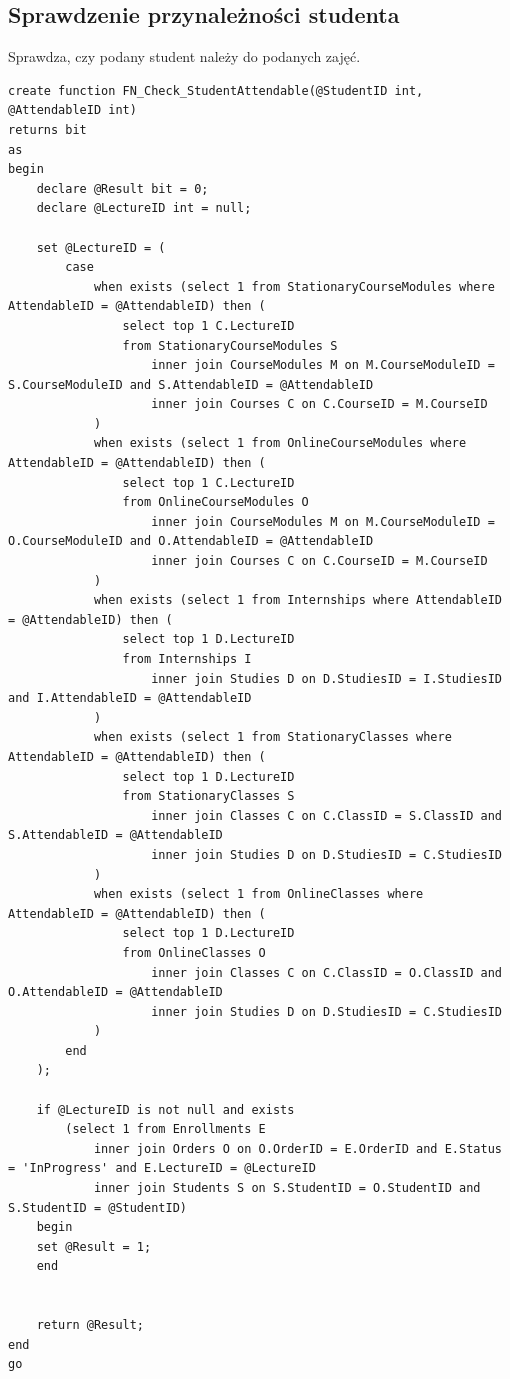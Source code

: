 \documentclass[11pt,a4paper]{article}
\begin{document}
\subsection{Sprawdzenie przynależności studenta}
Sprawdza, czy podany student należy do podanych zajęć.
\begin{Verbatim}[breaklines=true]
create function FN_Check_StudentAttendable(@StudentID int, @AttendableID int)
returns bit
as
begin
    declare @Result bit = 0;
    declare @LectureID int = null;

    set @LectureID = (
        case 
            when exists (select 1 from StationaryCourseModules where AttendableID = @AttendableID) then (
                select top 1 C.LectureID
                from StationaryCourseModules S
                    inner join CourseModules M on M.CourseModuleID = S.CourseModuleID and S.AttendableID = @AttendableID
                    inner join Courses C on C.CourseID = M.CourseID
            )
            when exists (select 1 from OnlineCourseModules where AttendableID = @AttendableID) then (
                select top 1 C.LectureID 
                from OnlineCourseModules O
                    inner join CourseModules M on M.CourseModuleID = O.CourseModuleID and O.AttendableID = @AttendableID
                    inner join Courses C on C.CourseID = M.CourseID
            )
            when exists (select 1 from Internships where AttendableID = @AttendableID) then (
                select top 1 D.LectureID 
                from Internships I
                    inner join Studies D on D.StudiesID = I.StudiesID and I.AttendableID = @AttendableID
            )
            when exists (select 1 from StationaryClasses where AttendableID = @AttendableID) then (
                select top 1 D.LectureID 
                from StationaryClasses S
                    inner join Classes C on C.ClassID = S.ClassID and S.AttendableID = @AttendableID
                    inner join Studies D on D.StudiesID = C.StudiesID
            )
            when exists (select 1 from OnlineClasses where AttendableID = @AttendableID) then (
                select top 1 D.LectureID
                from OnlineClasses O
                    inner join Classes C on C.ClassID = O.ClassID and O.AttendableID = @AttendableID
                    inner join Studies D on D.StudiesID = C.StudiesID
            )
        end
    );

    if @LectureID is not null and exists 
        (select 1 from Enrollments E 
            inner join Orders O on O.OrderID = E.OrderID and E.Status = 'InProgress' and E.LectureID = @LectureID
            inner join Students S on S.StudentID = O.StudentID and S.StudentID = @StudentID)
    begin 
    set @Result = 1;
    end


    return @Result;
end
go
\end{Verbatim}
\end{document}
